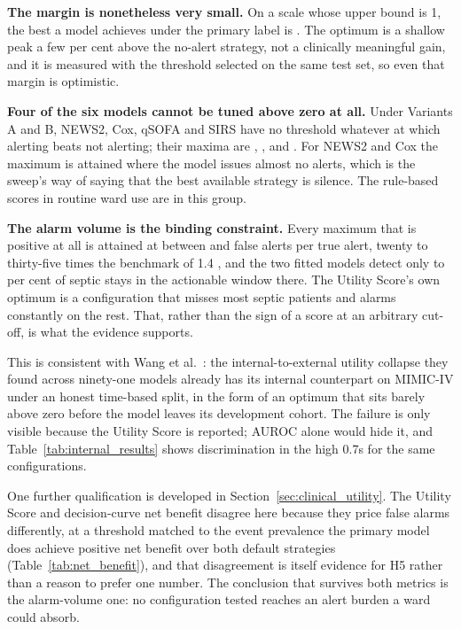 \textbf{The margin is nonetheless very small.} On a scale whose upper bound is
1, the best a model achieves under the primary label is
\pcUtilityMaxGbtB{}. The optimum is a shallow peak a few per cent above the
no-alert strategy, not a clinically meaningful gain, and it is measured with
the threshold selected on the same test set, so even that margin is
optimistic.

\textbf{Four of the six models cannot be tuned above zero at all.} Under
Variants A and B, NEWS2, Cox, qSOFA and SIRS have no threshold whatever at
which alerting beats not alerting; their maxima are
\pcUtilityMaxNewsB, \pcUtilityMaxCoxB, \pcUtilityMaxQsofaB{} and
\pcUtilityMaxSirsB. For NEWS2 and Cox the maximum is attained where the model
issues almost no alerts, which is the sweep's way of saying that the best
available strategy is silence. The rule-based scores in routine ward use are
in this group.

\textbf{The alarm volume is the binding constraint.} Every maximum that is
positive at all is attained at between \pcUtilityOptBurdenPrimaryC{} and
\pcUtilityOptBurdenNewsC{} false alerts per true alert, twenty to
thirty-five times the benchmark of 1.4 \cite{moor2023review}, and the two
fitted models detect only \pcUtilityOptDetectPctPrimaryB{} to
\pcUtilityOptDetectPctGbtC{} per cent of septic stays in the actionable window
there. The Utility Score's own optimum is a configuration that misses most
septic patients and alarms constantly on the rest. That, rather than the sign
of a score at an arbitrary cut-off, is what the evidence supports.

This is consistent with Wang et al.\ \cite{wang2025srpm}: the
internal-to-external utility collapse they found across ninety-one models
already has its internal counterpart on MIMIC-IV under an honest time-based
split, in the form of an optimum that sits barely above zero before the model
leaves its development cohort. The failure is only visible because the Utility
Score is reported; AUROC alone would hide it, and Table~\ref{tab:internal_results}
shows discrimination in the high 0.7s for the same configurations.

One further qualification is developed in Section~\ref{sec:clinical_utility}.
The Utility Score and decision-curve net benefit disagree here because they
price false alarms differently, at a threshold matched to the event
prevalence the primary model does achieve positive net benefit over both
default strategies (Table~\ref{tab:net_benefit}), and that disagreement is
itself evidence for H5 rather than a reason to prefer one number. The
conclusion that survives both metrics is the alarm-volume one: no
configuration tested reaches an alert burden a ward could absorb.

